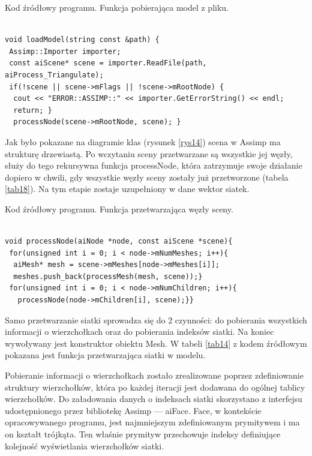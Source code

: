 \begin{table}[H]
\caption{Kod źródłowy programu. Funkcja pobierająca model z pliku.}
\label{tab13}
\begin{lstlisting}[frame=single]  % Start your code-block

void loadModel(string const &path) {
 Assimp::Importer importer;
 const aiScene* scene = importer.ReadFile(path, aiProcess_Triangulate);
 if(!scene || scene->mFlags || !scene->mRootNode) {
  cout << "ERROR::ASSIMP::" << importer.GetErrorString() << endl;
  return; }
  processNode(scene->mRootNode, scene); }
\end{lstlisting}
\end{table}

Jak było pokazane na diagramie klas (rysunek \ref{rys14}) scena w Assimp ma strukturę drzewiastą. Po wczytaniu sceny przetwarzane są wszystkie jej węzły, służy do tego rekursywna funkcja processNode, która zatrzymuje swoje działanie dopiero w chwili, gdy wszystkie węzły sceny zostały już przetworzone (tabela \ref{tab18}). Na tym etapie zostaje uzupełniony w dane wektor siatek.

\begin{table}[H]
\caption{Kod źródłowy programu. Funkcja przetwarzająca węzły sceny.}
\label{tab18}
\begin{lstlisting}[frame=single]  % Start your code-block

void processNode(aiNode *node, const aiScene *scene){
 for(unsigned int i = 0; i < node->mNumMeshes; i++){
  aiMesh* mesh = scene->mMeshes[node->mMeshes[i]];
  meshes.push_back(processMesh(mesh, scene));}
 for(unsigned int i = 0; i < node->mNumChildren; i++){
   processNode(node->mChildren[i], scene);}}
\end{lstlisting}
\end{table}

Samo przetwarzanie siatki sprowadza się do 2 czynności: do pobierania wszystkich informacji o wierzchołkach oraz do pobierania indeksów siatki. Na koniec wywoływany jest konstruktor obiektu Mesh. W tabeli \ref{tab14} z kodem źródłowym pokazana jest funkcja przetwarzająca siatki w modelu.

Pobieranie informacji o wierzchołkach zostało zrealizowane poprzez zdefiniowanie struktury wierzchołków, która po każdej iteracji jest dodawana do ogólnej tablicy wierzchołków. Do załadowania danych o indeksach siatki skorzystano z interfejsu udostępnionego przez bibliotekę Assimp --- aiFace. Face, w kontekście opracowywanego programu, jest najmniejszym zdefiniowanym prymitywem i ma on kształt trójkąta. Ten właśnie prymityw przechowuje indeksy definiujące kolejność wyświetlania wierzchołków siatki.

